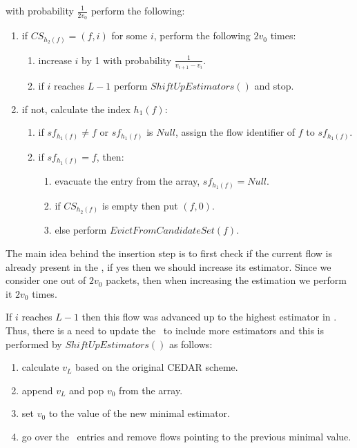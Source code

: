 with probability $\frac{1}{2v_0}$ perform the following:
  \begin{enumerate}
    \item\label{step:1} if $CS_{h_2(f)} = (f,i)$ for some $i$, perform the following $2v_0$ times:
    \begin{enumerate}
      \item\label{step:1:a} increase $i$ by 1 with probability $\frac{1}{v_{i+1}-v_i}$.
      \item\label{step:1:b} if $i$ reaches $L-1$ perform $ShiftUpEstimators()$ and stop.
    \end{enumerate}
    \item\label{step:2} if not, calculate the index $h_1(f)$:
    \begin{enumerate}
      \item\label{step:2:a} if $sf_{h_1(f)}\neq f$ or $sf_{h_1(f)}$ is $Null$, assign the flow identifier of $f$ to $sf_{h_1(f)}$.
      \item\label{step:2:b} if $sf_{h_1(f)}=f$, then:
      \begin{enumerate}
        \item\label{step:2:b:i} evacuate the entry from the array, $sf_{h_1(f)} = Null$.
        \item\label{step:2:b:ii} if $CS_{h_2(f)}$ is empty then put $(f,0)$.
        \item\label{step:2:b:iii} else perform $EvictFromCandidateSet(f)$.
      \end{enumerate}
    \end{enumerate}
  \end{enumerate}
  
The main idea behind the insertion step is to first check if the current flow is already present in the \cs, if yes then we should increase its estimator. Since we consider one out of $2v_0$ packets, then when increasing the estimation we perform it $2v_0$ times.

If $i$ reaches $L-1$ then this flow was advanced up to the highest estimator in \sea. Thus, there is a need to update the \sea\ to include more estimators and this is performed by $ShiftUpEstimators()$ as follows:
\begin{enumerate}
  \item calculate $v_L$ based on the original CEDAR scheme.
  \item append $v_L$ and pop $v_0$ from the array.
  \item set $v_0$ to the value of the new minimal estimator.
  \item\label{step:4} go over the \cs\ entries and remove flows pointing to the previous minimal value.
\end{enumerate}

